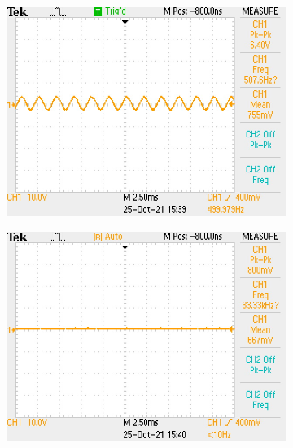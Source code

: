 \documentclass[a4paper,11pt]{article}
\begin{document}
\begin{figure}[h!]
\begin{subfigure}{0.3\textwidth}
        \includegraphics[width=\columnwidth]{power_output/filter_output_500Hz.JPG}
        \subcaption{}
    \end{subfigure}
    \begin{subfigure}{0.3\textwidth}
        \includegraphics[width=\columnwidth]{power_output/filter_output_2kHz.JPG}
        \subcaption{}
    \end{subfigure}
    \caption{}
\end{figure}
\end{document}
